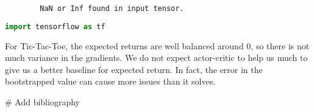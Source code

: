 \documentclass[12pt]{article}
\begin{document}
	\begin{lstlisting}
		NaN or Inf found in input tensor.
	\end{lstlisting}
	
	\begin{lstlisting}[language=python]
		import tensorflow as tf
	\end{lstlisting}
	
	For Tic-Tac-Toe, the expected returns are well balanced around 0, so there is not much variance in the gradients. We do not expect actor-critic to help us much to give us a better baseline for expected return. In fact, the error in the bootstrapped value can cause more issues than it solves.
	
	# Add bibliography
	
\end{document}
